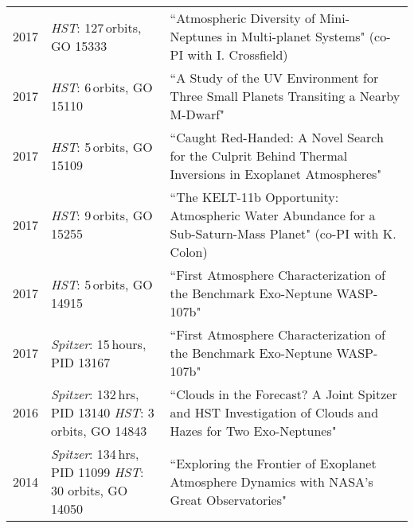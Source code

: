 \documentclass[12pt,letterpaper]{article}
\begin{document}
\begin{tabular}{ l p{5.0cm} p{10cm}}
  2017 &  \textit{HST}: 127\,orbits, GO 15333& ``Atmospheric Diversity of Mini-Neptunes in Multi-planet Systems" (co-PI with I. Crossfield)\\
  2017 &  \textit{HST}: 6\,orbits, GO 15110& ``A Study of the UV Environment for Three Small Planets Transiting a Nearby M-Dwarf" \\
  2017 &  \textit{HST}: 5\,orbits, GO 15109& ``Caught Red-Handed: A Novel Search for the Culprit Behind Thermal Inversions in Exoplanet Atmospheres" \\
  2017 &  \textit{HST}: 9\,orbits, GO 15255& ``The KELT-11b Opportunity: Atmospheric Water Abundance for a Sub-Saturn-Mass Planet" (co-PI with K. Colon)\\
 2017 & \textit{HST}: 5\,orbits, GO 14915 & ``First Atmosphere Characterization of the Benchmark Exo-Neptune WASP-107b"\\
 2017 & \textit{Spitzer}: 15\,hours, PID 13167& ``First Atmosphere Characterization of the Benchmark Exo-Neptune WASP-107b"\\
2016 & \textit{Spitzer}: 132\,hrs, PID 13140 \textit{HST}: 3 orbits, GO 14843 & ``Clouds in the Forecast? A Joint Spitzer and HST Investigation of Clouds and Hazes for Two Exo-Neptunes"\\
2014 & \textit{Spitzer}: 134\,hrs, PID 11099 \textit{HST}: 30 orbits, GO 14050& ``Exploring the Frontier of Exoplanet Atmosphere Dynamics with NASA's Great Observatories"
\end{tabular}
\end{document}
